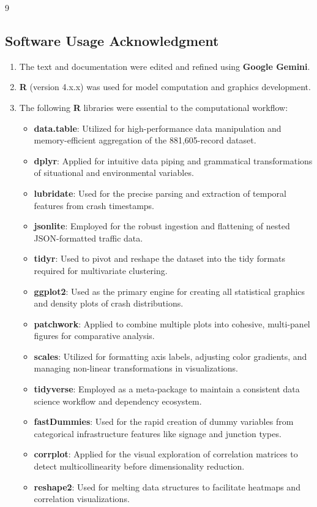 \documentclass[conference]{IEEEtran}
\begin{document}
\begin{thebibliography}{9}
\subsection*{Software Usage Acknowledgment}
\begin{enumerate}
	\item The text and documentation were edited and refined using \textbf{Google Gemini}.
	\item \textbf{R} (version 4.x.x) was used for model computation and graphics development.
	\item The following \textbf{R} libraries were essential to the computational workflow:
\begin{itemize}
	\item \textbf{data.table}: Utilized for high-performance data manipulation and memory-efficient aggregation of the 881,605-record dataset.
	\item \textbf{dplyr}: Applied for intuitive data piping and grammatical transformations of situational and environmental variables.
	\item \textbf{lubridate}: Used for the precise parsing and extraction of temporal features from crash timestamps.
	\item \textbf{jsonlite}: Employed for the robust ingestion and flattening of nested JSON-formatted traffic data.
	\item \textbf{tidyr}: Used to pivot and reshape the dataset into the tidy formats required for multivariate clustering.
	\item \textbf{ggplot2}: Used as the primary engine for creating all statistical graphics and density plots of crash distributions.
	\item \textbf{patchwork}: Applied to combine multiple plots into cohesive, multi-panel figures for comparative analysis.
	\item \textbf{scales}: Utilized for formatting axis labels, adjusting color gradients, and managing non-linear transformations in visualizations.
	\item \textbf{tidyverse}: Employed as a meta-package to maintain a consistent data science workflow and dependency ecosystem.
	\item \textbf{fastDummies}: Used for the rapid creation of dummy variables from categorical infrastructure features like signage and junction types.
	\item \textbf{corrplot}: Applied for the visual exploration of correlation matrices to detect multicollinearity before dimensionality reduction.
	\item \textbf{reshape2}: Used for melting data structures to facilitate heatmaps and correlation visualizations.

\end{itemize}
\end{enumerate}
\end{thebibliography}
\end{document}
